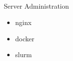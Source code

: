 \subsection{}
Server Administration
\begin{itemize}
	\item nginx
	\item docker
	\item slurm
\end{itemize}


